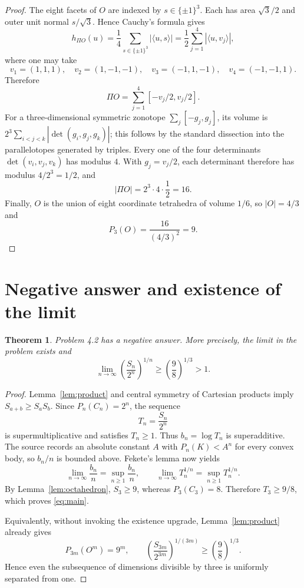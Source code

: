 \documentclass[10pt]{article}
\newtheorem{theorem}{Theorem}
\begin{document}
\begin{proof}
The eight facets of $O$ are indexed by $s\in\{\pm1\}^3$.  Each has area
$\sqrt3/2$ and outer unit normal $s/\sqrt3$.  Hence Cauchy's formula gives
\[
 h_{\Pi O}(u)=\frac14\sum_{s\in\{\pm1\}^3}|\langle u,s\rangle|
 =\frac12\sum_{j=1}^4|\langle u,v_j\rangle|,
\]
where one may take
\[
 v_1=(1,1,1),\quad v_2=(1,-1,-1),\quad
 v_3=(-1,1,-1),\quad v_4=(-1,-1,1).
\]
Therefore
\[
 \Pi O=\sum_{j=1}^4[-v_j/2,v_j/2].
\]
For a three-dimensional symmetric zonotope
$\sum_j[-g_j,g_j]$, its volume is
$2^3\sum_{i<j<k}|\det(g_i,g_j,g_k)|$; this follows by the standard
dissection into the parallelotopes generated by triples.  Every one of the
four determinants $\det(v_i,v_j,v_k)$ has modulus $4$.  With
$g_j=v_j/2$, each determinant therefore has modulus $4/2^3=1/2$, and
\[
 |\Pi O|=2^3\cdot4\cdot\frac12=16.
\]
Finally, $O$ is the union of eight coordinate tetrahedra of volume $1/6$,
so $|O|=4/3$ and
\[
 P_3(O)=\frac{16}{(4/3)^2}=9.
\]
\end{proof}

\section{Negative answer and existence of the limit}

\begin{theorem}\label{thm:main}
Problem 4.2 has a negative answer.  More precisely, the limit in the
problem exists and
\begin{equation}\label{eq:main}
 \lim_{n\to\infty}\left(\frac{S_n}{2^n}\right)^{1/n}
 \ge \left(\frac98\right)^{1/3}>1.
\end{equation}
\end{theorem}

\begin{proof}
Lemma~\ref{lem:product} and central symmetry of Cartesian products imply
$S_{a+b}\ge S_aS_b$.  Since $P_n(C_n)=2^n$, the sequence
\[
 T_n=\frac{S_n}{2^n}
\]
is supermultiplicative and satisfies $T_n\ge1$.  Thus
$b_n=\log T_n$ is superadditive.  The source records an absolute constant
$A$ with $P_n(K)<A^n$ for every convex body, so $b_n/n$ is bounded above.
Fekete's lemma now yields
\[
 \lim_{n\to\infty}\frac{b_n}{n}=\sup_{n\ge1}\frac{b_n}{n},
 \qquad
 \lim_{n\to\infty}T_n^{1/n}=\sup_{n\ge1}T_n^{1/n}.
\]
By Lemma~\ref{lem:octahedron}, $S_3\ge9$, whereas $P_3(C_3)=8$.
Therefore $T_3\ge9/8$, which proves \eqref{eq:main}.

Equivalently, without invoking the existence upgrade, Lemma~\ref{lem:product}
already gives
\[
 P_{3m}(O^m)=9^m,
 \qquad
 \left(\frac{S_{3m}}{2^{3m}}\right)^{1/(3m)}
 \ge\left(\frac98\right)^{1/3}.
\]
Hence even the subsequence of dimensions divisible by three is uniformly
separated from one.
\end{proof}
\end{document}
